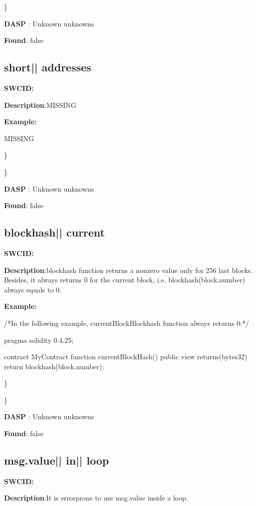 \documentclass{article}
\begin{document}
\} 

\textbf{DASP} : Unknown unknowns

\textbf{Found}: false

\subsection{short{|\textunderscore| }addresses} 
\textbf{SWC{\textunderscore }ID:} 

\textbf{Description}:MISSING


\textbf{Example:} 
\begin{ffcode} 

MISSING

\end{ffcode} 
\} 

\} 

\textbf{DASP} : Unknown unknowns

\textbf{Found}: false

\subsection{blockhash{|\textunderscore| }current} 
\textbf{SWC{\textunderscore }ID:} 

\textbf{Description}:blockhash function returns a non{\textendash}zero value only for 256 last blocks. Besides, it always returns 0 for the current block, i.e. blockhash(block.number) always equals to 0.


\textbf{Example:} 
\begin{ffcode} 

/*In the following example, currentBlockBlockhash function always returns 0:*/ 

pragma solidity 0.4.25;

contract MyContract {
    function currentBlockHash() public view returns(bytes32) {
        return blockhash(block.number);
    }
}

\end{ffcode} 
\} 

\} 

\textbf{DASP} : Unknown unknowns

\textbf{Found}: false

\subsection{msg.value{|\textunderscore| }in{|\textunderscore| }loop} 
\textbf{SWC{\textunderscore }ID:} 

\textbf{Description}:It is error{\textendash}prone to use msg.value inside a loop.
\end{document}
